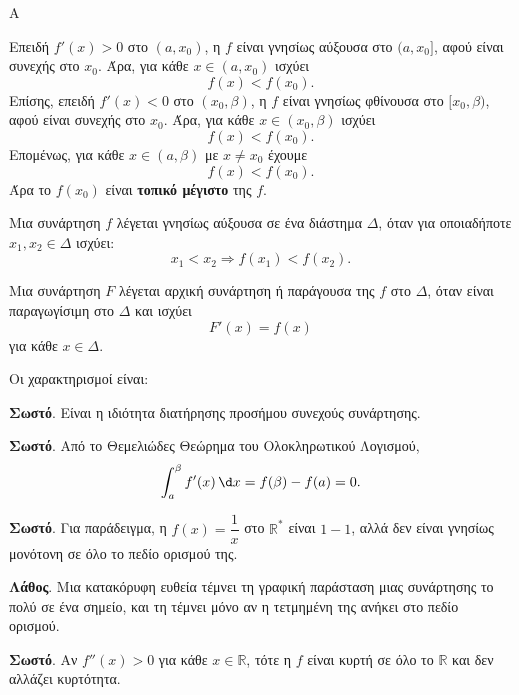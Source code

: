 \begin{thema}{Α}
\begin{erwthma}
\item Επειδή $f'(x)>0$ στο $(a,x_0)$, η $f$ είναι γνησίως αύξουσα στο $(a,x_0]$, αφού είναι συνεχής στο $x_0$. Άρα, για κάθε $x\in(a,x_0)$ ισχύει
\[
f(x)<f(x_0).
\]
Επίσης, επειδή $f'(x)<0$ στο $(x_0,\beta)$, η $f$ είναι γνησίως φθίνουσα στο $[x_0,\beta)$, αφού είναι συνεχής στο $x_0$. Άρα, για κάθε $x\in(x_0,\beta)$ ισχύει
\[
f(x)<f(x_0).
\]
Επομένως, για κάθε $x\in(a,\beta)$ με $x\neq x_0$ έχουμε
\[
f(x)<f(x_0).
\]
Άρα το $f(x_0)$ είναι \textbf{τοπικό μέγιστο} της $f$.

\item Μια συνάρτηση $f$ λέγεται γνησίως αύξουσα σε ένα διάστημα $\varDelta$, όταν για οποιαδήποτε $x_1,x_2\in\varDelta$ ισχύει:
\[
x_1<x_2\Rightarrow f(x_1)<f(x_2).
\]

\item Μια συνάρτηση $F$ λέγεται αρχική συνάρτηση ή παράγουσα της $f$ στο $\varDelta$, όταν είναι παραγωγίσιμη στο $\varDelta$ και ισχύει
\[
F'(x)=f(x)
\]
για κάθε $x\in\varDelta$.

\item Οι χαρακτηρισμοί είναι:
\begin{alist}
\item \textbf{Σωστό}. Είναι η ιδιότητα διατήρησης προσήμου συνεχούς συνάρτησης.
\item \textbf{Σωστό}. Από το Θεμελιώδες Θεώρημα του Ολοκληρωτικού Λογισμού,
\[
\dint_a^\beta f'(x)\,\d x=f(\beta)-f(a)=0.
\]
\item \textbf{Σωστό}. Για παράδειγμα, η $f(x)=\dfrac{1}{x}$ στο $\mathbb{R}^*$ είναι $1-1$, αλλά δεν είναι γνησίως μονότονη σε όλο το πεδίο ορισμού της.
\item \textbf{Λάθος}. Μια κατακόρυφη ευθεία τέμνει τη γραφική παράσταση μιας συνάρτησης το πολύ σε ένα σημείο, και τη τέμνει μόνο αν η τετμημένη της ανήκει στο πεδίο ορισμού.
\item \textbf{Σωστό}. Αν $f''(x)>0$ για κάθε $x\in\mathbb{R}$, τότε η $f$ είναι κυρτή σε όλο το $\mathbb{R}$ και δεν αλλάζει κυρτότητα.
\end{alist}
\end{erwthma}
\end{thema}

